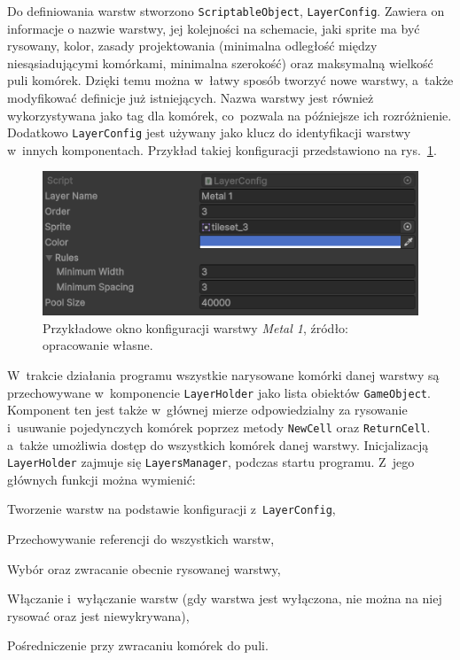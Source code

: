 \indent Do definiowania warstw stworzono \texttt{ScriptableObject}, \texttt{LayerConfig}.
Zawiera on informacje o nazwie warstwy, jej kolejności na schemacie, jaki sprite ma być rysowany, kolor,
zasady projektowania (minimalna odległość między niesąsiadującymi komórkami, minimalna szerokość)
oraz maksymalną wielkość puli komórek.
Dzięki temu można w~łatwy sposób tworzyć nowe warstwy, a~także modyfikować definicje już istniejących.
Nazwa warstwy jest również wykorzystywana jako tag dla komórek, co~pozwala na późniejsze ich rozróżnienie.
Dodatkowo \texttt{LayerConfig} jest używany jako klucz do identyfikacji warstwy w~innych komponentach.
Przykład takiej konfiguracji przedstawiono na rys.~\ref{fig:layer_config}.

\begin{figure}[h]
    \centering
    \includegraphics[width=.9\textwidth]{chapters/chapter4/rys/layer_config}
    \caption[Przykładowe okno konfiguracji warstwy \textit{Metal 1}.]
    {Przykładowe okno konfiguracji warstwy \textit{Metal 1}, źródło: opracowanie własne.}
    \label{fig:layer_config}
\end{figure}

\indent W~trakcie działania programu wszystkie narysowane komórki danej warstwy
są przechowywane w~komponencie \texttt{LayerHolder} jako lista obiektów \texttt{GameObject}.
Komponent ten jest także w~głównej mierze odpowiedzialny za rysowanie
i~usuwanie pojedynczych komórek poprzez metody \texttt{NewCell} oraz \texttt{ReturnCell}.
a~także umożliwia dostęp do wszystkich komórek danej warstwy.
Inicjalizacją \texttt{LayerHolder} zajmuje się \texttt{LayersManager}, podczas startu programu.
Z~jego głównych funkcji można wymienić:

\begin{citemize}
    \item Tworzenie warstw na podstawie konfiguracji z~\texttt{LayerConfig},
    \item Przechowywanie referencji do wszystkich warstw,
    \item Wybór oraz zwracanie obecnie rysowanej warstwy,
    \item Włączanie i~wyłączanie warstw (gdy warstwa jest wyłączona, nie można na niej rysować oraz jest niewykrywana),
    \item Pośredniczenie przy zwracaniu komórek do puli.
\end{citemize}


